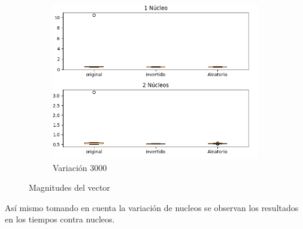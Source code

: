 \documentclass{article}
\begin{document}
\begin{figure}[h!]
\begin{subfigure}[b]{0.45\linewidth}
           \includegraphics[width=\linewidth]{Figure_1(3000).png}
           \caption{Variaci\'on 3000}
           \label{fig:westminster_aerea}
        \end{subfigure}
        \caption{Magnitudes del vector}
        \label{fig:westminster}
\end{figure}

As\'i mismo tomando en cuenta la variaci\'on de nucleos se observan los resultados en los tiempos contra nucleos.
\end{document}
